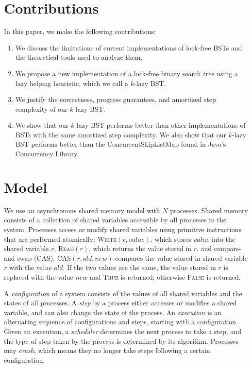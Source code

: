 \documentclass[letterpaper,twocolumn]{article}
\begin{document}
\section{Contributions}\label{section_contribution}
In this paper, we make the following contributions:
\begin{enumerate}
	\item We discuss the limitations of current implementations of lock-free BSTs and the theoretical tools used to analyze them.
	\item We propose a new implementation of a lock-free binary search tree using a lazy helping heuristic, which we call a $k$-lazy BST. 
	\item We justify the correctness, progress guarantees, and amortized step complexity of our $k$-lazy BST.
	\item We show that our $k$-lazy BST performs better than other implementations of BSTs with the same amortized step complexity. We also show that our $k$-lazy BST performs better than the ConcurrentSkipListMap found in Java's Concurrency Library. 
\end{enumerate}

\section{Model}\label{section_model}

We use an asynchronous shared memory model with $N$ processes. Shared memory consists of a collection of shared variables accessible by all processes in the system. Processes access or modify shared variables using primitive instructions that are performed atomically: \textsc{Write}$(r, value)$, which stores $value$ into the shared variable $r$, \textsc{Read}$(r)$, which returns the value stored in $r$, and compare-and-swap (CAS). CAS$(r, old, new)$ compares the value stored in shared variable $r$ with the value $old$. If the two values are the same, the value stored in $r$ is replaced with the value $new$ and \textsc{True} is returned; otherwise \textsc{False} is returned. 

A \textit{configuration} of a system consists of the values of all shared variables and the states of all processes. A \textit{step} by a process either accesses or modifies a shared variable, and can also change the state of the process. An \textit{execution} is an alternating sequence of configurations and steps, starting with a configuration.  Given an execution, a \textit{scheduler} determines the next process to take a step, and the type of step taken by the process is determined by its algorithm. Processes may \textit{crash}, which means they no longer take steps following a certain configuration.
\end{document}
